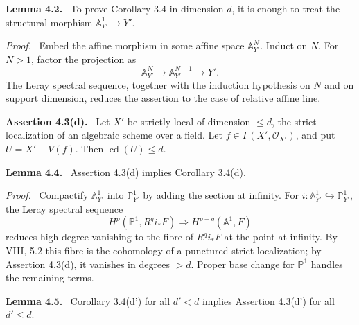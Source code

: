 \documentclass[12pt]{article}
\newcommand{\Oo}{\mathcal{O}}
\newenvironment{statement}[1]{\par\medskip\noindent\textbf{#1.}\ }{\par\medskip}
\newenvironment{prooftext}[1][Proof]{\par\noindent\emph{#1.}\ }{\par\medskip}
\begin{document}
\begin{statement}{Lemma 4.2}
To prove Corollary 3.4 in dimension \(d\), it is enough to treat the structural morphism \(\mathbb A^1_{Y'}\to Y'\).
\end{statement}

\begin{prooftext}
Embed the affine morphism in some affine space \(\mathbb A^N_{Y'}\). Induct on \(N\). For \(N>1\), factor the projection as
\[
\mathbb A^N_{Y'}\to \mathbb A^{N-1}_{Y'}\to Y'.
\]
The Leray spectral sequence, together with the induction hypothesis on \(N\) and on support dimension, reduces the assertion to the case of relative affine line.
\end{prooftext}

\begin{statement}{Assertion 4.3(d)}
Let \(X'\) be strictly local of dimension \(\le d\), the strict localization of an algebraic scheme over a field. Let \(f\in\Gamma(X',\Oo_{X'})\), and put \(U=X'-V(f)\). Then \(\operatorname{cd}(U)\le d\).
\end{statement}

\begin{statement}{Lemma 4.4}
Assertion 4.3(d) implies Corollary 3.4(d).
\end{statement}

\begin{prooftext}
Compactify \(\mathbb A^1_{Y'}\) into \(\mathbb P^1_{Y'}\) by adding the section at infinity. For \(i:\mathbb A^1_{Y'}\hookrightarrow\mathbb P^1_{Y'}\), the Leray spectral sequence
\[
H^p(\mathbb P^1,R^qi_*F)\Rightarrow H^{p+q}(\mathbb A^1,F)
\]
reduces high-degree vanishing to the fibre of \(R^qi_*F\) at the point at infinity. By VIII, 5.2 this fibre is the cohomology of a punctured strict localization; by Assertion 4.3(d), it vanishes in degrees \(>d\). Proper base change for \(\mathbb P^1\) handles the remaining terms.
\end{prooftext}

\begin{statement}{Lemma 4.5}
Corollary 3.4(d') for all \(d'<d\) implies Assertion 4.3(d') for all \(d'\le d\).
\end{statement}
\end{document}
